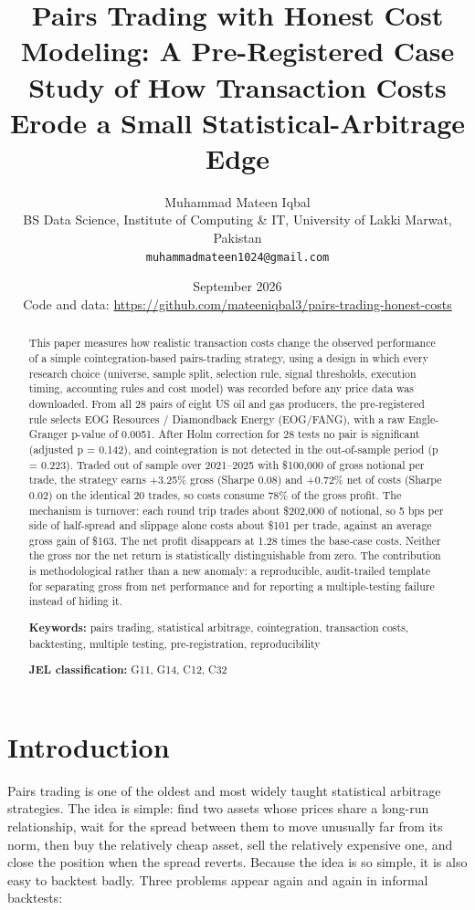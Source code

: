 \documentclass[11pt]{article}
\title{Pairs Trading with Honest Cost Modeling: A Pre-Registered Case Study of How Transaction Costs Erode a Small Statistical-Arbitrage Edge}
\author{Muhammad Mateen Iqbal\\[2pt]
  {\normalsize BS Data Science, Institute of Computing \& IT, University of Lakki Marwat, Pakistan}\\
  {\normalsize\texttt{muhammadmateen1024@gmail.com}}}
\date{September 2026\\[2pt] {\small Code and data: \url{https://github.com/mateeniqbal3/pairs-trading-honest-costs}}}
\begin{document}
\maketitle
\thispagestyle{empty}

\begin{abstract}
This paper measures how realistic transaction costs change the observed
performance of a simple cointegration-based pairs-trading strategy, using a
design in which every research choice (universe, sample split, selection
rule, signal thresholds, execution timing, accounting rules and cost model)
was recorded before any price data was downloaded. From all 28 pairs of
eight US oil and gas producers, the pre-registered rule selects EOG
Resources / Diamondback Energy (EOG/FANG), with a raw Engle-Granger p-value
of 0.0051. After Holm correction for 28 tests no pair is significant
(adjusted p = 0.142), and cointegration is not detected in the
out-of-sample period (p = 0.223). Traded out of sample over 2021--2025 with
\$100,000 of gross notional per trade, the strategy earns +3.25\% gross
(Sharpe 0.08) and +0.72\% net of costs (Sharpe 0.02) on the identical 20
trades, so costs consume 78\% of the gross profit. The mechanism is
turnover: each round trip trades about \$202,000 of notional, so 5 bps per
side of half-spread and slippage alone costs about \$101 per trade, against
an average gross gain of \$163. The net profit disappears at 1.28 times the
base-case costs. Neither the gross nor the net return is statistically
distinguishable from zero. The contribution is methodological rather than
a new anomaly: a reproducible, audit-trailed template for separating gross
from net performance and for reporting a multiple-testing failure instead
of hiding it.

\medskip
\noindent \textbf{Keywords:} pairs trading, statistical arbitrage, cointegration,
transaction costs, backtesting, multiple testing, pre-registration,
reproducibility

\noindent \textbf{JEL classification:} G11, G14, C12, C32
\end{abstract}

\hypertarget{introduction}{%
\section{Introduction}\label{introduction}}

Pairs trading is one of the oldest and most widely taught statistical
arbitrage strategies. The idea is simple: find two assets whose prices
share a long-run relationship, wait for the spread between them to move
unusually far from its norm, then buy the relatively cheap asset, sell the
relatively expensive one, and close the position when the spread reverts.
Because the idea is so simple, it is also easy to backtest badly. Three
problems appear again and again in informal backtests:
\end{document}
